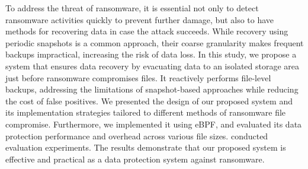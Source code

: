 To address the threat of ransomware, it is essential not only to detect ransomware activities quickly to prevent further damage,
but also to have methods for recovering data in case the attack succeeds.
While recovery using periodic snapshots is a common approach, their coarse granularity makes frequent backups impractical, increasing the risk of data loss.
In this study, we propose a system that ensures data recovery by evacuating data to an isolated storage area just before ransomware compromises files.
It reactively performs file-level backups, addressing the limitations of snapshot-based approaches while reducing the cost of false positives.
We presented the design of our proposed system and its implementation strategies tailored to different methods of ransomware file compromise.
Furthermore, we implemented it using eBPF, and
evaluated its data protection performance and overhead across various file sizes.
conducted evaluation experiments.
The results demonstrate that our proposed system is effective and practical as a data protection system against ransomware.
